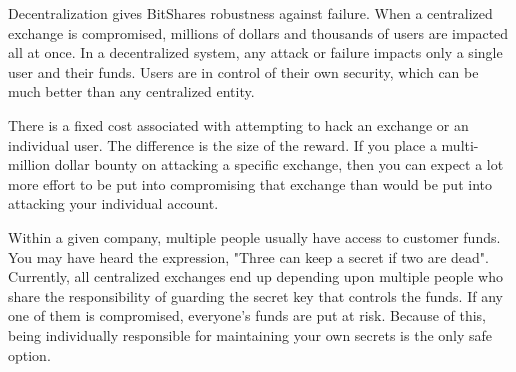 Decentralization gives BitShares robustness against failure. When a
centralized exchange is compromised, millions of dollars and thousands of users
are impacted all at once. In a decentralized system, any attack or failure
impacts only a single user and their funds. Users are in control of their own
security, which can be much better than any centralized entity.

There is a fixed cost associated with attempting to hack an exchange or an
individual user. The difference is the size of the reward. If you place a
multi-million dollar bounty on attacking a specific exchange, then you can
expect a lot more effort to be put into compromising that exchange than would
be put into attacking your individual account.

Within a given company, multiple people usually have access to customer funds.
You may have heard the expression, "Three can keep a secret if two are dead".
Currently, all centralized exchanges end up depending upon multiple people who
share the responsibility of guarding the secret key that controls the funds.
If any one of them is compromised, everyone's funds are put at risk. Because
of this, being individually responsible for maintaining your own secrets is the
only safe option.
